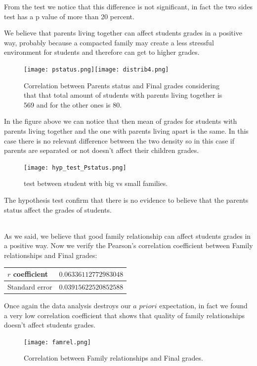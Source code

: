 \documentclass[a4paper, 11pt]{report}
\theoremstyle{definition}
\numberwithin{equation}{section}		%
\numberwithin{figure}{section}			%
\numberwithin{table}{section}				%
\begin{document}
\begin{itemize}
From the test we notice that this difference is not significant, in fact
the two sides test has a p value of more than 20 percent.

We believe that parents living together can affect students grades in a positive way, probably because a compacted family may create a less stressful environment for students and therefore can get to higher grades.
\begin{figure}[h]\centering
\texttt{[image: pstatus.png]}\quad\texttt{[image: distrib4.png]}
\caption{Correlation between Parents status and Final grades considering that that total amount of students with parents living together is 569 and for the other ones is 80.}
\end{figure}

In the figure above we can notice that then mean of grades for students with parents living together and the one with parents living apart is the same. In this case there is no relevant difference between the two density so in this case if parents are separated or not doesn't affect their children grades.

\begin{figure}[h]\centering
\texttt{[image: hyp\_test\_Pstatus.png]}
\caption{test between student with big vs  small families.}
\end{figure}

The hypothesis test confirm that there is no evidence to believe that the 
parents status affect the grades of students.

\\As we said, we believe that good family relationship can affect students grades in a positive way.
Now we verify the Pearson's correlation coefficient between Family relationships and Final grades:
\begin{center}
\begin{tabular}{|p{3cm}|p{4cm}|}
$r$ coefficient & $0.06336112772983048$ \\
\hline
Standard error & $0.03915622520852588$ \\
\hline
\end{tabular}
\end{center}
Once again the data analysis destroys our $a$ $priori$ expectation, in fact we found a very low correlation coefficient that shows that quality of family relationships doesn't affect students grades.

\begin{figure}[h]\centering
\texttt{[image: famrel.png]}
\caption{Correlation between Family relationships and Final grades.}
\end{figure}



\end{itemize}
\end{document}
